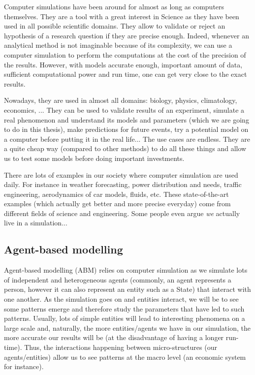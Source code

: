     Computer simulations have been around for almost as long as computers themselves. They are a tool with a great interest in Science as they have been used in all possible scientific domains. They allow to validate or reject an hypothesis of a research question if they are precise enough. Indeed, whenever an analytical method is not imaginable because of its complexity, we can use a computer simulation to perform the computations at the cost of the precision of the results. However, with models accurate enough, important amount of data, sufficient computational power and run time, one can get very close to the exact results. \cite{exprimentationNumeriqueParOrdinateur}

    Nowadays, they are used in almost all domains: biology, physics, climatology, economics, ... They can be used to validate results of an experiment, simulate a real phenomenon and understand its models and parameters (which we are going to do in this thesis), make predictions for future events, try a potential model on a computer before putting it in the real life... The use cases are endless. They are a quite cheap way (compared to other methods) to do all these things and allow us to test some models before doing important investments.

    There are lots of examples in our society where computer simulation are used daily. For instance in weather forecasting, power distribution and needs, traffic engineering, aerodynamics of car models, fluids, etc. These state-of-the-art examples (which actually get better and more precise everyday) come from different fields of science and engineering. \cite{weatherForecasting} Some people even argue \emph{we} actually live in a simulation...

    \subsection{Agent-based modelling}
    Agent-based modelling (ABM) relies on computer simulation as we simulate lots of independent and heterogeneous agents (commonly, an agent represents a person, however it can also represent an entity such as a State) that interact with one another. As the simulation goes on and entities interact, we will be to see some patterns emerge and therefore study the parameters that have led to such patterns. Usually, lots of simple entities will lead to interesting phenomena on a large scale and, naturally, the more entities/agents we have in our simulation, the more accurate our results will be (at the disadvantage of having a longer run-time). Thus, the interactions happening between micro-structures (our agents/entities) allow us to see patterns at the macro level (an economic system for instance).
    
